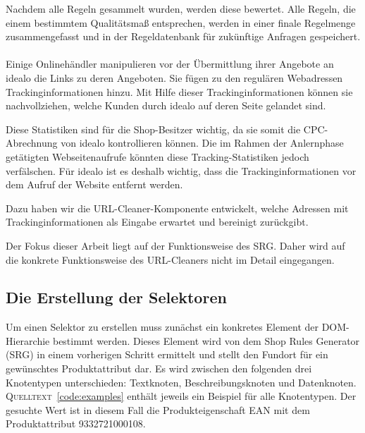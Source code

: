 Nachdem alle Regeln gesammelt wurden, werden diese bewertet.
Alle Regeln, die einem bestimmtem Qualitätsmaß entsprechen, werden in einer finale Regelmenge zusammengefasst und in
der Regeldatenbank für zukünftige Anfragen gespeichert.
\\
~\\
Einige Onlinehändler manipulieren vor der Übermittlung ihrer Angebote an idealo die Links zu deren Angeboten.
Sie fügen zu den regulären Webadressen Trackinginformationen hinzu.
Mit Hilfe dieser Trackinginformationen können sie nachvollziehen, welche Kunden durch idealo auf deren Seite gelandet
sind.

Diese Statistiken sind für die Shop-Besitzer wichtig, da sie somit die CPC-Abrechnung von idealo kontrollieren
können.
Die im Rahmen der Anlernphase getätigten Webseitenaufrufe könnten diese Tracking-Statistiken jedoch verfälschen.
Für idealo ist es deshalb wichtig, dass die Trackinginformationen vor dem Aufruf der Website entfernt werden.

Dazu haben wir die URL-Cleaner-Komponente entwickelt, welche Adressen mit Trackinginformationen als Eingabe erwartet und
bereinigt zurückgibt.

Der Fokus dieser Arbeit liegt auf der Funktionsweise des SRG.
Daher wird auf die konkrete Funktionsweise des URL-Cleaners nicht im Detail eingegangen.

\subsection{Die Erstellung der Selektoren}
\label{subsec:erstellen-von-selektoren}

Um einen Selektor zu erstellen muss zunächst ein konkretes Element der DOM-Hierarchie bestimmt werden.
Dieses Element wird von dem Shop Rules Generator (SRG) in einem vorherigen Schritt ermittelt und stellt den Fundort für
ein gewünschtes Produktattribut dar.
Es wird zwischen den folgenden drei Knotentypen unterschieden: Textknoten, Beschreibungsknoten und Datenknoten.
\textsc{Quelltext}~\ref{code:examples} enthält jeweils ein Beispiel für alle Knotentypen.
Der gesuchte Wert ist in diesem Fall die Produkteigenschaft EAN mit dem Produktattribut 9332721000108.

